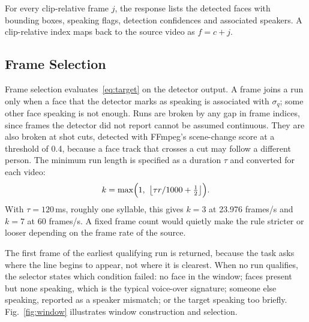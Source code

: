 \documentclass[conference]{IEEEtran}
\begin{document}
For every clip-relative frame $j$, the response lists the detected faces with bounding boxes, speaking flags, detection confidences and associated speakers. A clip-relative index maps back to the source video as $f=c+j$.

\subsection{Frame Selection}
\label{sec:select}
Frame selection evaluates~\eqref{eq:target} on the detector output. A frame joins a run only when a face that the detector marks as speaking is associated with $\sigma_q$; some other face speaking is not enough. Runs are broken by any gap in frame indices, since frames the detector did not report cannot be assumed continuous. They are also broken at shot cuts, detected with FFmpeg's scene-change score at a threshold of 0.4, because a face track that crosses a cut may follow a different person. The minimum run length is specified as a duration $\tau$ and converted for each video:
\begin{equation}
k=\max\Bigl(1,\ \bigl\lfloor \tau r/1000+\tfrac{1}{2}\bigr\rfloor\Bigr).
\label{eq:k}
\end{equation}
With $\tau=120$\,ms, roughly one syllable, this gives $k=3$ at 23.976 frames/s and $k=7$ at 60 frames/s. A fixed frame count would quietly make the rule stricter or looser depending on the frame rate of the source.

The first frame of the earliest qualifying run is returned, because the task asks where the line begins to appear, not where it is clearest. When no run qualifies, the selector states which condition failed: no face in the window; faces present but none speaking, which is the typical voice-over signature; someone else speaking, reported as a speaker mismatch; or the target speaking too briefly. Fig.~\ref{fig:window} illustrates window construction and selection.
\end{document}
